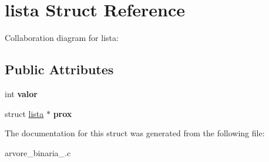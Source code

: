\hypertarget{structlista}{}\section{lista Struct Reference}
\label{structlista}


Collaboration diagram for lista\+:
\subsection*{Public Attributes}
\begin{DoxyCompactItemize}
\item 
\mbox{\label{structlista_a0c18db2673ee962dd02ab0b85546e780}} 
int {\bfseries valor}
\item 
\mbox{\label{structlista_a3b0e375147c1163d74544fd206a1f1de}} 
struct \hyperlink{structlista}{lista} $\ast$ {\bfseries prox}
\end{DoxyCompactItemize}


The documentation for this struct was generated from the following file\+:\begin{DoxyCompactItemize}
\item 
arvore\+\_\+binaria\+\_.\+c\end{DoxyCompactItemize}
